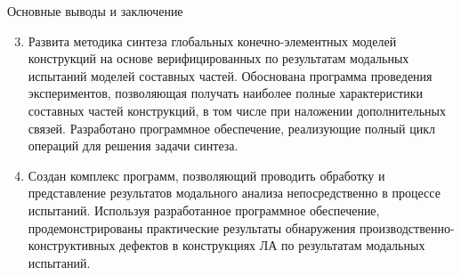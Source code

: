 \begin{frame}{Основные выводы и заключение}
	\begin{enumerate}
		\setcounter{enumi}{2}
		\item Развита методика синтеза глобальных конечно-элементных моделей конструкций на основе верифицированных по результатам модальных испытаний моделей составных частей. Обоснована программа проведения экспериментов, позволяющая получать наиболее полные характеристики составных частей конструкций, в том числе при наложении дополнительных связей. Разработано программное обеспечение, реализующие полный цикл операций для решения задачи синтеза.
		\item Создан комплекс программ, позволяющий проводить обработку и представление результатов модального анализа непосредственно в процессе испытаний. Используя разработанное программное обеспечение, продемонстрированы практические результаты обнаружения производственно-конструктивных дефектов в конструкциях ЛА по результатам модальных испытаний.
	\end{enumerate}
\end{frame}